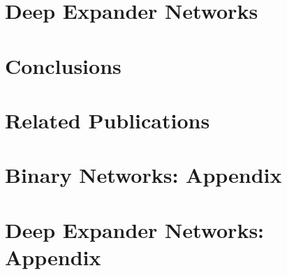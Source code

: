 \documentclass[11pt]{book}
\begin{document}
\chapter{Deep Expander Networks}
\label{ch:den}

\chapter{Conclusions}
\label{ch:wrapup}

\chapter*{Related Publications}
\label{ch:relatedPubs}

%
\appendix
\chapter{Binary Networks: Appendix}
\label{ch:apndx1}


\chapter{Deep Expander Networks: Appendix}
\label{ch:apndx2}




\end{document}
